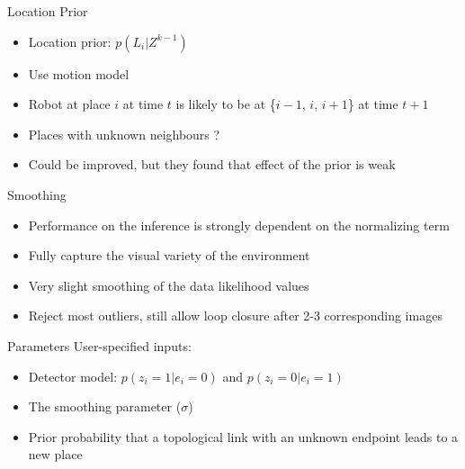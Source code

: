 \begin{frame}{Location Prior}
    \begin{itemize}
        \item Location prior: $p(L_i|Z^{k-1})$
        \item Use motion model
        \item Robot at place $i$ at time $t$ is likely to be at \{$i-1$, $i$, $i+1$\} at time $t+1$
        \item Places with unknown neighbours ?
        \item Could be improved, but they found that effect of the prior is weak
    \end{itemize}
\end{frame}

\begin{frame}{Smoothing}
    \begin{itemize}
        \item Performance on the inference is strongly dependent on the normalizing term
        \item Fully capture the visual variety of the environment
        \item Very slight smoothing of the data likelihood values
        \item Reject most outliers, still allow loop closure after 2-3 corresponding images
    \end{itemize}
\end{frame}

\begin{frame}{Parameters}
    User-specified inputs:
    \begin{itemize}
        \item Detector model: $p(z_i=1|e_i=0)$ and $p(z_i=0|e_i=1)$
        \item The smoothing parameter ($\sigma$)
        \item Prior probability that a topological link with an unknown endpoint leads to a new place
    \end{itemize}
\end{frame}

